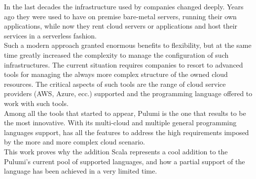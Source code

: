 In the last decades the infrastructure used by companies changed deeply.
Years ago they were used to have on premise bare-metal servers, running their own applications, while now they rent cloud servers or applications and host their services in a serverless fashion.\\
Such a modern approach granted enormous benefits to flexibility, but at the same time greatly increased the complexity to manage the configuration of such infrastructures.
The current situation requires companies to resort to advanced tools for managing the always more complex structure of the owned cloud resources.
The critical aspects of such tools are the range of cloud service providers (AWS, Azure, ecc.) supported and the programming language offered to work with such tools.\\
Among all the tools that started to appear, Pulumi is the one that results to be the most innovative.
With its multi-cloud and multiple general programming languages support, has all the features to address the high requirements imposed by the more and more complex cloud scenario.\\
This work proves why the addition Scala represents a cool addition to the Pulumi's current pool of supported languages, and how a partial support of the language has been achieved in a very limited time.
\newline
\newline
\newline
\newline
\newline
\newline





